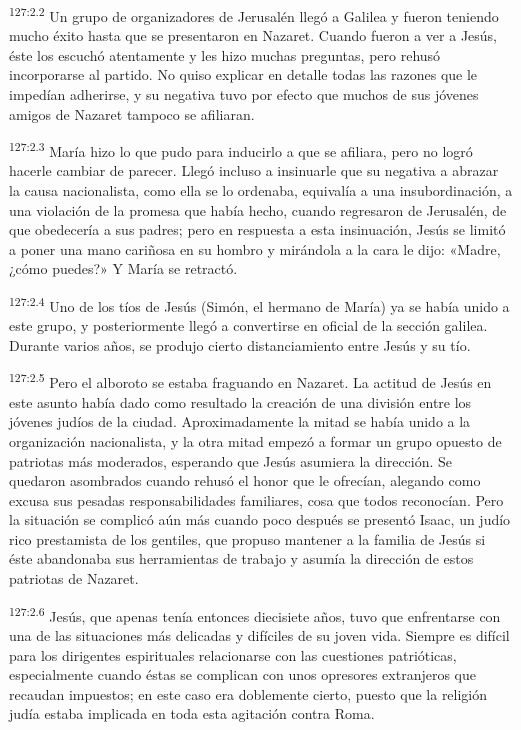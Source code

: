 \par
\textsuperscript{127:2.2} Un grupo de organizadores de Jerusalén llegó a Galilea y fueron teniendo mucho éxito hasta que se presentaron en Nazaret. Cuando fueron a ver a Jesús, éste los escuchó atentamente y les hizo muchas preguntas, pero rehusó incorporarse al partido. No quiso explicar en detalle todas las razones que le impedían adherirse, y su negativa tuvo por efecto que muchos de sus jóvenes amigos de Nazaret tampoco se afiliaran.

\par
\textsuperscript{127:2.3} María hizo lo que pudo para inducirlo a que se afiliara, pero no logró hacerle cambiar de parecer. Llegó incluso a insinuarle que su negativa a abrazar la causa nacionalista, como ella se lo ordenaba, equivalía a una insubordinación, a una violación de la promesa que había hecho, cuando regresaron de Jerusalén, de que obedecería a sus padres; pero en respuesta a esta insinuación, Jesús se limitó a poner una mano cariñosa en su hombro y mirándola a la cara le dijo: «Madre, ¿cómo puedes?» Y María se retractó.

\par
\textsuperscript{127:2.4} Uno de los tíos de Jesús (Simón, el hermano de María) ya se había unido a este grupo, y posteriormente llegó a convertirse en oficial de la sección galilea. Durante varios años, se produjo cierto distanciamiento entre Jesús y su tío.

\par
\textsuperscript{127:2.5} Pero el alboroto se estaba fraguando en Nazaret. La actitud de Jesús en este asunto había dado como resultado la creación de una división entre los jóvenes judíos de la ciudad. Aproximadamente la mitad se había unido a la organización nacionalista, y la otra mitad empezó a formar un grupo opuesto de patriotas más moderados, esperando que Jesús asumiera la dirección. Se quedaron asombrados cuando rehusó el honor que le ofrecían, alegando como excusa sus pesadas responsabilidades familiares, cosa que todos reconocían. Pero la situación se complicó aún más cuando poco después se presentó Isaac, un judío rico prestamista de los gentiles, que propuso mantener a la familia de Jesús si éste abandonaba sus herramientas de trabajo y asumía la dirección de estos patriotas de Nazaret.

\par
\textsuperscript{127:2.6} Jesús, que apenas tenía entonces diecisiete años, tuvo que enfrentarse con una de las situaciones más delicadas y difíciles de su joven vida. Siempre es difícil para los dirigentes espirituales relacionarse con las cuestiones patrióticas, especialmente cuando éstas se complican con unos opresores extranjeros que recaudan impuestos; en este caso era doblemente cierto, puesto que la religión judía estaba implicada en toda esta agitación contra Roma.


